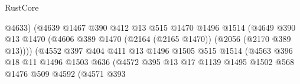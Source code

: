 \begin{lexlean}{RustCore}
\begin{coremodule}
                                              @4633)
                                            (@4639
                                              @1467
                                              @390
                                              @412
                                              @13
                                              @515
                                              @1470
                                              @1496
                                              @1514
                                              (@4649
                                                @390
                                                @13
                                                @1470
                                                (@4606
                                                  @389
                                                  @1470
                                                  (@2164 (@2165 @1470))
                                                  (@2056 (@2170 @389 @13))))
                                              (@4552
                                                @397
                                                @404
                                                @411
                                                @13
                                                @1496
                                                @1505
                                                @515
                                                @1514
                                                (@4563
                                                  @396
                                                  @18
                                                  @11
                                                  @1496
                                                  @1503
                                                  @636
                                                  (@4572
                                                    @395
                                                    @13
                                                    @17
                                                    @1139
                                                    @1495
                                                    @1502
                                                    @568
                                                    @1476
                                                    @509
                                                    @4592
                                                    (@4571
                                                      @393

\end{coremodule}
\end{lexlean}
